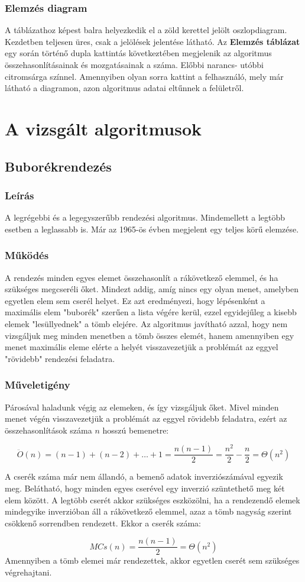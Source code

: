 \documentclass{elteikthesis}
\begin{document}
\subsubsection{Elemzés diagram}
A táblázathoz képest balra helyezkedik el a zöld kerettel jelölt oszlopdiagram. Kezdetben teljesen üres, csak a jelölések jelentése látható. Az \textbf{Elemzés táblázat} egy során történő dupla kattintás következtében megjelenik az algoritmus összehasonlításainak és mozgatásainak a száma. Előbbi narancs- utóbbi citromsárga színnel. Amennyiben olyan sorra kattint a felhasználó, mely már látható a diagramon, azon algoritmus adatai eltűnnek a felületről.

\section{A vizsgált algoritmusok}
\subsection{Buborékrendezés}
\subsubsection{Leírás}
A legrégebbi és a legegyszerűbb rendezési algoritmus. Mindemellett a legtöbb esetben a leglassabb is. Már az 1965-ös évben megjelent egy teljes körű elemzése\cite{Demuth}.
\subsubsection{Működés}
 A rendezés minden egyes elemet összehasonlít a rákövetkező elemmel, és ha szükséges megcseréli őket. Mindezt addig, amíg nincs egy olyan menet, amelyben egyetlen elem sem cserél helyet. Ez azt eredményezi, hogy lépésenként a maximális elem "buborék" szerűen a lista végére kerül, ezzel egyidejűleg a kisebb elemek "lesüllyednek" a tömb elejére. Az algoritmus javítható azzal, hogy nem vizsgáljuk meg minden menetben a tömb összes elemét, hanem amennyiben egy menet maximális eleme elérte a helyét visszavezetjük a problémát az eggyel "rövidebb" rendezési feladatra\cite{Fekete}.
 \subsubsection{Műveletigény}
Párosával haladunk végig az elemeken, és így vizsgáljuk őket. Mivel minden menet végén visszavezetjük a problémát az eggyel rövidebb feladatra, ezért az összehasonlítások száma $n$ hosszú bemenetre:\par
$$\ddot{O}(n)=(n-1)+(n-2)+\ldots+1=\frac{n(n-1)}{2}=\frac{n^2}{2}-\frac{n}{2}=\Theta(n^2)$$
\par A cserék száma már nem állandó, a bemenő adatok inverziószámával egyezik meg. Belátható, hogy minden egyes cserével egy inverzió szüntethető meg két elem között. A legtöbb cserét akkor szükséges eszközölni, ha a rendezendő elemek mindegyike inverzióban áll a rákövetkező elemmel, azaz a tömb nagyság szerint csökkenő sorrendben rendezett. Ekkor a cserék száma:\par
$$MCs(n)=\frac{n(n-1)}{2}=\Theta(n^2)$$
Amennyiben a tömb elemei már rendezettek, akkor egyetlen cserét sem szükséges végrehajtani.
\end{document}
